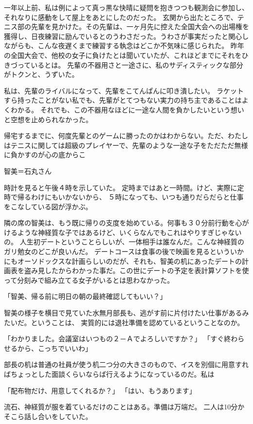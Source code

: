 一年以上前、私は例によって真っ黒な快晴に疑問を抱きつつも観測会に参加し、それなりに感動をして屋上をあとにしたのだった。
玄関から出たところで、テニス部の先輩を見かけた。その先輩は、一ヶ月先に控えた全国大会への出場権を獲得し、日夜練習に励んでいるとのうわさだった。うわさが事実だったと関心しながらも、こんな夜遅くまで練習する執念はどこか不気味に感じられた。
昨年の全国大会で、他校の女子に負けたとは聞いていたが、これほどまでにそれをひきづっているとは。
先輩の不器用さと一途さに、私のサディスティックな部分がトクンと、うずいた。

私は、先輩のライバルになって、先輩をこてんぱんに叩き潰したい。
ラケットすら持ったことがない私でも、先輩がとてつもない実力の持ち主であることはよくわかる。
それでも、この不器用なほどに一途な人間を負かしたいという想いと空想を止められなかった。

帰宅するまでに、何度先輩とのゲームに勝ったのかはわからない。ただ、わたしはテニスに関しては超級のプレイヤーで、先輩のような一途な子をただただ無様に負かすのが心の底からこ




智美＝石丸さん

時計を見ると午後４時を示していた。
定時まではあと一時間。けど、実際に定時で帰るわけにもいかないから、
５時になっても、いつも通りだらだらと仕事をこなしている図が浮かぶ。

隣の席の智美は、もう既に帰りの支度を始めている。何事も３０分前行動を心がけるような神経質な子ではあるけど、いくらなんでもこれはやりすぎじゃないの。
人生初デートということらしいが、一体相手は誰なんだ。こんな神経質のガリ勉女のどこが良いんだ。
デートコースは食事の後で映画を見るといういかにもオーソドックスな計画らしいのだが、それも、智美の机にあったデートの計画表を盗み見したからわかった事だ。この世にデートの予定を表計算ソフトを使って分刻みで組み立てる女子がいるとは思わなかった。

「智美、帰る前に明日の朝の最終確認してもいい？」

智美の様子を横目で見ていた水無月部長も、逃がす前に片付けたい仕事があるみたいだ。ということは、
実質的には退社準備を認めているということなのか。

「わかりました。会議室はいつもの２－Ａでよろしいですか？」
「すぐ終わらせるから、こっちでいいわ」

部長の机は普通の社員が使う机二つ分の大きさのもので、イスを別個に用意すればちょっとした面談くらいならば行えるようになっているのだ。私は

「配布物だけ、用意してくれるか？」
「はい、もうあります」

流石、神経質が服を着ているだけのことはある。準備は万端だ。
二人は10分かそこら話し合いをしていた。

